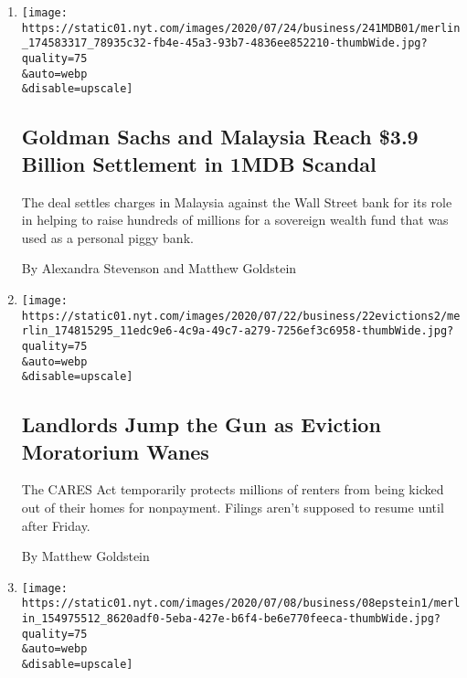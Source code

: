 \begin{enumerate}
\def\labelenumi{\arabic{enumi}.}
\item
  \href{/2020/07/24/business/goldman-sachs-malaysia-1mdb.html}{}

  \texttt{[image: https://static01.nyt.com/images/2020/07/24/business/241MDB01/merlin\_174583317\_78935c32-fb4e-45a3-93b7-4836ee852210-thumbWide.jpg?quality=75\\\&auto=webp\\\&disable=upscale]}

  \hypertarget{goldman-sachs-and-malaysia-reach-39-billion-settlement-in-1mdb-scandal}{%
  \subsection{Goldman Sachs and Malaysia Reach \$3.9 Billion Settlement
  in 1MDB
  Scandal}\label{goldman-sachs-and-malaysia-reach-39-billion-settlement-in-1mdb-scandal}}

  The deal settles charges in Malaysia against the Wall Street bank for
  its role in helping to raise hundreds of millions for a sovereign
  wealth fund that was used as a personal piggy bank.

  By Alexandra Stevenson and Matthew Goldstein
\item
  \href{/2020/07/23/business/evictions-moratorium-cares-act.html}{}

  \texttt{[image: https://static01.nyt.com/images/2020/07/22/business/22evictions2/merlin\_174815295\_11edc9e6-4c9a-49c7-a279-7256ef3c6958-thumbWide.jpg?quality=75\\\&auto=webp\\\&disable=upscale]}

  \hypertarget{landlords-jump-the-gun-as-eviction-moratorium-wanes}{%
  \subsection{Landlords Jump the Gun as Eviction Moratorium
  Wanes}\label{landlords-jump-the-gun-as-eviction-moratorium-wanes}}

  The CARES Act temporarily protects millions of renters from being
  kicked out of their homes for nonpayment. Filings aren't supposed to
  resume until after Friday.

  By Matthew Goldstein
\item
  \href{/2020/07/07/business/jeffrey-epstein-deutsche-bank-settlement.html}{}

  \texttt{[image: https://static01.nyt.com/images/2020/07/08/business/08epstein1/merlin\_154975512\_8620adf0-5eba-427e-b6f4-be6e770feeca-thumbWide.jpg?quality=75\\\&auto=webp\\\&disable=upscale]}


\end{enumerate}
